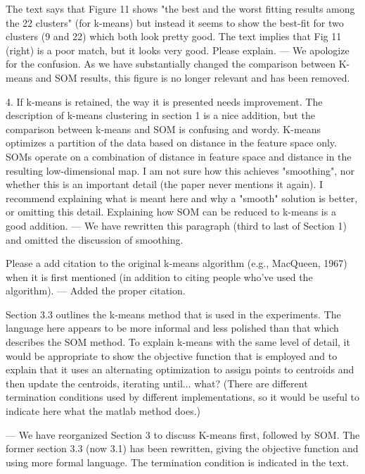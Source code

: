 The text says that Figure 11 shows "the best and the worst fitting results among the 22 clusters" (for k-means) but instead it seems to show the best-fit for two clusters (9 and 22) which both look pretty good.  The text implies that Fig 11 (right) is a poor match, but it looks very good.  Please explain.
--- We apologize for the confusion. As we have substantially changed the comparison between K-means and SOM results, this figure is no longer relevant and has been removed.


4. If k-means is retained, the way it is presented needs improvement. The description of k-means clustering in section 1 is a nice addition, but the comparison between k-means and SOM is confusing and wordy. K-means optimizes a partition of the data based on distance in the feature space only.  SOMs operate on a combination of distance in feature space and distance in the resulting low-dimensional map.  I am not sure how this achieves "smoothing", nor whether this is an important detail (the paper never mentions it again).  I recommend explaining what is meant here and why a "smooth" solution is better, or omitting this detail.  Explaining how SOM can be reduced to k-means is a good addition.
--- We have rewritten this paragraph (third to last of Section 1) and omitted the discussion of smoothing. 

Please a add citation to the original k-means algorithm (e.g., MacQueen, 1967) when it is first mentioned (in addition to citing people who've used the algorithm).
--- Added the proper citation.

Section 3.3 outlines the k-means method that is used in the experiments.  The language here appears to be more informal and less polished than that which describes the SOM method.  To explain k-means with the same level of detail, it would be appropriate to show the objective function that is employed and to explain that it uses an alternating optimization to assign points to centroids and then update the centroids, iterating until... what?  (There are different termination conditions used by different implementations, so it would be useful to indicate here what the matlab method does.)

--- We have reorganized Section 3 to discuss K-means first, followed by SOM. The former section 3.3 (now 3.1) has been rewritten, giving the objective function and using more formal language. The termination condition is indicated in the text.

